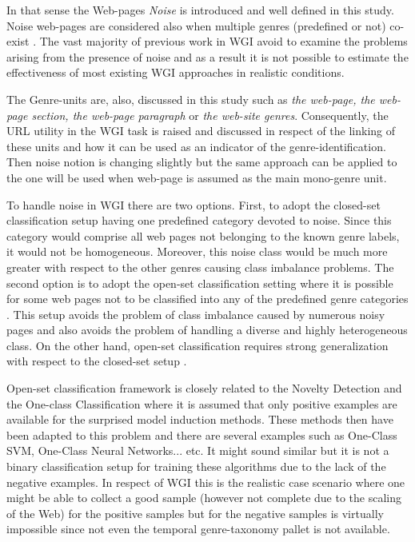 \documentclass[
    11pt, %
    english, %
    singlespacing, %
    headsepline, %
]{DoctoralThesis} %
\begin{document}
In that sense the Web-pages \textit{Noise} is introduced and well defined in this study. {Noise} web-pages are considered also when multiple genres (predefined or not) co-exist \parencite{santini2011cross,levering2008using}. The vast majority of previous work in WGI avoid to examine the problems arising from the presence of noise and as a result it is not possible to estimate the effectiveness of most existing WGI approaches in realistic conditions.

The Genre-units are, also, discussed in this study such as \textit{the web-page, the web-page section, the web-page paragraph} or \textit{the web-site genres}. Consequently, the URL utility in the WGI task is raised and discussed in respect of the linking of these units and how it can be used as an indicator of the genre-identification. Then noise notion is changing slightly but the same approach can be applied to the one will be used when web-page is assumed as the main mono-genre unit.

To handle noise in WGI there are two options. First, to adopt the closed-set classification setup having one predefined category devoted to noise. Since this category would comprise all web pages not belonging to the known genre labels, it would not be homogeneous. Moreover, this noise class would be much more greater with respect to the other genres causing class imbalance problems. The second option is to adopt the open-set classification setting where it is possible for some web pages not to be classified into any of the predefined genre categories \parencite{pritsos2013open}. This setup avoids the problem of class imbalance caused by numerous noisy pages and also avoids the problem of handling a diverse and highly heterogeneous class. On the other hand, open-set classification requires strong generalization with respect to the closed-set setup \parencite{scheirer2013toward}.

Open-set classification framework is closely related to the Novelty Detection and the One-class Classification where it is assumed that only positive examples are available for the surprised model induction methods. These methods then have been adapted to this problem and there are several examples such as One-Class SVM, One-Class Neural Networks... etc. It might sound similar but it is not a binary classification setup for training these algorithms due to the lack of the negative examples. In respect of WGI this is the realistic case scenario where one might be able to collect a good sample (however not complete due to the scaling of the Web) for the positive samples but for the negative samples is virtually impossible since not even the temporal genre-taxonomy pallet is not available. 
\end{document}
